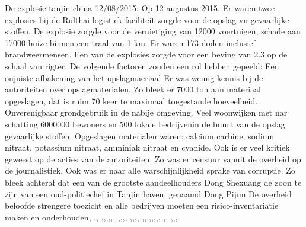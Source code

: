 \newline \indent De explosie tanjin china 12/08/2015. 
Op 12 augustus 2015. Er waren twee explosies bij de Rulthai logistiek  faciliteit zorgde voor de opslag vn  gevaarlijke stoffen. De explosie zorgde voor de vernietiging van 12000 voertuigen, schade aan 17000 huize binnen een traal van 1 km. Er waren 173 doden inclusief brandweermensen.
Een van de explosies zorgde voor  een beving van 2.3 op de schaal van rigter.
De volgende factoren zouden een rol hebben gepeeld:
Een onjuiste afbakening van het opslagmaeriaal
Er was  weinig kennis bij de autoriteiten over  opslagmaterialen. Zo bleek er 7000 ton aan materiaal opgeslagen, dat is ruim 70 keer te maximaal toegestande hoeveelheid. 
Onverenigbaar grondgebruik in de nabije omgeving. Veel woonwijken met nar schatting 6000000 bewoners en 500 lokale bedrijvenin de buurt van de opslag gevaarlijke stoffen.
Opgeslagen materialen  waren: calcium carbine, sodium nitraat, potassium nitraat, amminiak nitraat en cyanide.
Ook is er veel kritiek geweest op de acties van de autoriteiten. Zo was er censuur vanuit de overheid op de journalistiek.
Ook was er naar alle warschijnlijkheid sprake van corruptie. Zo bleek achteraf dat een van de grootste aandeelhouders Dong Shexuang de zoon te zijn van een oud-politiechef in Tanjin haven, genaamd Dong Pijun
De overheid beloofde strengere toezicht en alle bedrijven moeten een risico-inventariatie maken en onderhouden\cite{jiang16042019TanjinExplosion},
\cite{staff31082015tanjinblastunrevealed},\cite{chinafile18082015tanjinexplosion},
\cite{pinghuang2410201TanjinFactreport},\cite{portoTanjinExplosionSight},\cite{imago17082015TanjinApartmentImages},\cite{trager14082015Chemicalblast},\cite{pangeramo27082015TanjinExplosion},\cite{ap06082020ammaniumnitrate},
\cite{morris14082015TanjinIndustryImpact},\cite{milesyu20082015exposingtoxicgovlines},\cite{artemis30032016tanjininsurance},\cite{aidenxiatanjinblast},
\cite{danwangTanjinflexreport},\cite{keyHighlightsTanjin},\cite{hartley13082015videofootage},\cite{odonnel01062017firetanjinblast2015},
\cite{fan15082015newyorkermistrustchina},\cite{yanlidongchinamediaframingTanjin},\cite{evans27092017TnjinInsurance},\cite{jasi26032019chineschemplant},\cite{shiqingTanjinExecutiveSentence},\cite{sophiebeach15082015},\cite{hamzeh05082020BeirutBlast},\cite{chemwatch18082015TanjiinExplosion},
\cite{thehindu15062019chinaExplosion},\cite{santagotimes24032019chinablast},
\cite{klingecorp28042020causedTanjin},\cite{mcgarryExplosions2017},\cite{roswnfeld13082015TanjinReports},
